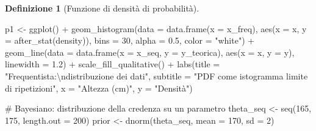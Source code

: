\documentclass[
  italian,
  letterpaper,
  a4paper,
  11pt,
  open=any]{scrbook}
\newenvironment{Shaded}{\begin{snugshade}}{\end{snugshade}}
\newcommand{\AttributeTok}[1]{\textcolor[rgb]{0.40,0.45,0.13}{#1}}
\newcommand{\CommentTok}[1]{\textcolor[rgb]{0.37,0.37,0.37}{#1}}
\newcommand{\DecValTok}[1]{\textcolor[rgb]{0.68,0.00,0.00}{#1}}
\newcommand{\FloatTok}[1]{\textcolor[rgb]{0.68,0.00,0.00}{#1}}
\newcommand{\FunctionTok}[1]{\textcolor[rgb]{0.28,0.35,0.67}{#1}}
\newcommand{\NormalTok}[1]{\textcolor[rgb]{0.00,0.23,0.31}{#1}}
\newcommand{\OtherTok}[1]{\textcolor[rgb]{0.00,0.23,0.31}{#1}}
\newcommand{\SpecialCharTok}[1]{\textcolor[rgb]{0.37,0.37,0.37}{#1}}
\newcommand{\StringTok}[1]{\textcolor[rgb]{0.13,0.47,0.30}{#1}}
\theoremstyle{plain}
\theoremstyle{definition}
\theoremstyle{definition}
\newtheorem{definition}{Definizione}[chapter]
\theoremstyle{remark}
\begin{document}
\begin{definition}[Funzione di densità di
probabilità]
\begin{Shaded}
\begin{Highlighting}[]
\NormalTok{p1 }\OtherTok{\textless{}{-}} \FunctionTok{ggplot}\NormalTok{() }\SpecialCharTok{+}
  \FunctionTok{geom\_histogram}\NormalTok{(}\AttributeTok{data =} \FunctionTok{data.frame}\NormalTok{(}\AttributeTok{x =}\NormalTok{ x\_freq), }\FunctionTok{aes}\NormalTok{(}\AttributeTok{x =}\NormalTok{ x, }\AttributeTok{y =} \FunctionTok{after\_stat}\NormalTok{(density)),}
                 \AttributeTok{bins =} \DecValTok{30}\NormalTok{, }\AttributeTok{alpha =} \FloatTok{0.5}\NormalTok{, }\AttributeTok{color =} \StringTok{"white"}\NormalTok{) }\SpecialCharTok{+}
  \FunctionTok{geom\_line}\NormalTok{(}\AttributeTok{data =} \FunctionTok{data.frame}\NormalTok{(}\AttributeTok{x =}\NormalTok{ x\_seq, }\AttributeTok{y =}\NormalTok{ y\_teorica), }
            \FunctionTok{aes}\NormalTok{(}\AttributeTok{x =}\NormalTok{ x, }\AttributeTok{y =}\NormalTok{ y), }\AttributeTok{linewidth =} \FloatTok{1.2}\NormalTok{) }\SpecialCharTok{+}
  \FunctionTok{scale\_fill\_qualitative}\NormalTok{() }\SpecialCharTok{+}
  \FunctionTok{labs}\NormalTok{(}\AttributeTok{title =} \StringTok{"Frequentista:}\SpecialCharTok{\textbackslash{}n}\StringTok{distribuzione dei dati"}\NormalTok{,}
       \AttributeTok{subtitle =} \StringTok{"PDF come istogramma limite di ripetizioni"}\NormalTok{,}
       \AttributeTok{x =} \StringTok{"Altezza (cm)"}\NormalTok{, }\AttributeTok{y =} \StringTok{"Densità"}\NormalTok{) }

\CommentTok{\# Bayesiano: distribuzione della credenza su un parametro}
\NormalTok{theta\_seq }\OtherTok{\textless{}{-}} \FunctionTok{seq}\NormalTok{(}\DecValTok{165}\NormalTok{, }\DecValTok{175}\NormalTok{, }\AttributeTok{length.out =} \DecValTok{200}\NormalTok{)}
\NormalTok{prior }\OtherTok{\textless{}{-}} \FunctionTok{dnorm}\NormalTok{(theta\_seq, }\AttributeTok{mean =} \DecValTok{170}\NormalTok{, }\AttributeTok{sd =} \DecValTok{2}\NormalTok{)}


\end{Highlighting}
\end{Shaded}
\end{definition}
\end{document}

